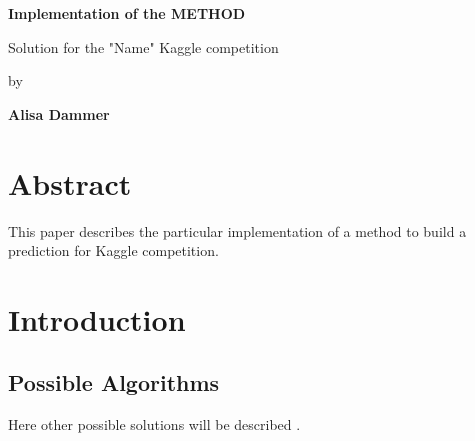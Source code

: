 \documentclass[
  twoside,
  11pt, a4paper,
  footinclude=true,
  headinclude=true,
  cleardoublepage=empty
]{scrreprt}
\begin{document}
    \begin{titlepage}
        \begin{center}
            \vspace{2.5cm}
            
            \LARGE
            \textbf{Implementation of the METHOD}
            
            \vspace{2.5cm}
            
            \normalsize
            Solution for the "Name" Kaggle competition

            
            \vspace{0.6cm}

            by

            \vspace{0.6cm}
            
            \large
            \textbf{Alisa Dammer}\\
            
        \end{center}
    \end{titlepage}

    \chapter*{Abstract}
        \onehalfspace
        This paper describes the particular implementation of a method to build a prediction for Kaggle competition.
        \singlespace

    \tableofcontents

    \chapter{Introduction}
        \section{Possible Algorithms}
            Here other possible solutions will be described \cite{wiki:latex}.
\end{document}
